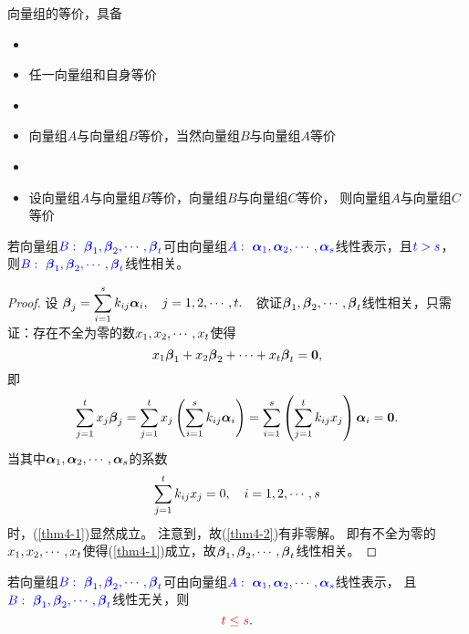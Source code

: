 \begin{frame}
向量组的等价，具备
\begin{itemize}
\item {}
\item[] 任一向量组和自身等价  
\item {}
\item[] 向量组$A$与向量组$B$等价，当然向量组$B$与向量组$A$等价  
\item {}
\item[] 设向量组$A$与向量组$B$等价，向量组$B$与向量组$C$等价，
  则向量组$A$与向量组$C$等价
\end{itemize} 
\end{frame}

\begin{frame}
\begin{dingli}
  若向量组$\textcolor{blue}{B:~\boldsymbol{\beta}_1,\boldsymbol{\beta}_2,\cdots,\boldsymbol{\beta}_t}$可由向量组$\textcolor{blue}{A:~\boldsymbol{\alpha}_1,\boldsymbol{\alpha}_2,\cdots,\boldsymbol{\alpha}_s}$线性表示，且$\textcolor{blue}{t>s}$，
  则$\textcolor{blue}{B:~\boldsymbol{\beta}_1,\boldsymbol{\beta}_2,\cdots,\boldsymbol{\beta}_t}$线性相关。
\end{dingli}
\pause 
\begin{proof}
设
$
\displaystyle \boldsymbol{\beta}_j=\sum_{i=1}^sk_{ij}\boldsymbol{\alpha}_i, \quad j=1,2,\cdots,t.~~
$  
欲证$\boldsymbol{\beta}_1,\boldsymbol{\beta}_2,\cdots,\boldsymbol{\beta}_t$线性相关，只需证：存在不全为零的数$x_1,x_2,\cdots,x_t$使得
\begin{equation}\label{thm4-1}
  x_1\boldsymbol{\beta}_1+x_2\boldsymbol{\beta}_2+\cdots+x_t\boldsymbol{\beta}_t=\boldsymbol{0},
\end{equation}     
即
$$
\sum_{j=1}^t x_j \boldsymbol{\beta}_j = \sum_{j=1}^t x_j\left(\sum_{i=1}^sk_{ij}\boldsymbol{\alpha}_i\right)
= \sum_{i=1}^s\left(\sum_{j=1}^t k_{ij} x_j \right)  \boldsymbol{\alpha}_i = \boldsymbol{0}.
$$  
当其中$\boldsymbol{\alpha}_1,\boldsymbol{\alpha}_2,\cdots,\boldsymbol{\alpha}_s$的系数
\begin{equation}\label{thm4-2}
  \sum_{j=1}^tk_{ij}x_j = 0, \quad i=1,2,\cdots,s
\end{equation}
时，(\ref{thm4-1})显然成立。 
注意到，故(\ref{thm4-2})有非零解。 即有不全为零的$x_1,x_2,\cdots,x_t$使得(\ref{thm4-1})成立，故$\boldsymbol{\beta}_1,\boldsymbol{\beta}_2,\cdots,\boldsymbol{\beta}_t$线性相关。
\end{proof}
\end{frame}

\begin{frame}
\begin{tuilun}
  若向量组$\textcolor{blue}{B:~\boldsymbol{\beta}_1,\boldsymbol{\beta}_2,\cdots,\boldsymbol{\beta}_t}$可由向量组$\textcolor{blue}{A:~\boldsymbol{\alpha}_1,\boldsymbol{\alpha}_2,\cdots,\boldsymbol{\alpha}_s}$线性表示，
  且$\textcolor{blue}{B:~\boldsymbol{\beta}_1,\boldsymbol{\beta}_2,\cdots,\boldsymbol{\beta}_t}$线性无关，则
  $$\textcolor{red}{t\le s}.$$
\end{tuilun}
\end{frame}

